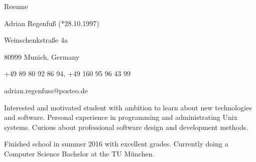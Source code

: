 \documentclass[11pt,a4paper]{article}
\begin{document}
\thispagestyle{empty}
\pagestyle{empty}

{\bf\centerline{{\huge Resume}}}
\vspace{6pt}

\centerline{Adrian Regenfuß (*28.10.1997)}
\centerline{Weinschenkstraße 4a}
\centerline{80999 Munich, Germany}
\centerline{+49 89 80 92 86 94, +49 160 95 96 43 99}
\centerline{adrian.regenfuss@posteo.de}

\vspace{5pt}

Interested and motivated student with ambition to learn
about new technologies and software. Personal experience in programming
and administrating Unix systems. Curious about professional software
design and development methods.

Finished school in summer 2016 with excellent grades. Currently doing a
Computer Science Bachelor at the TU München.
\end{document}
